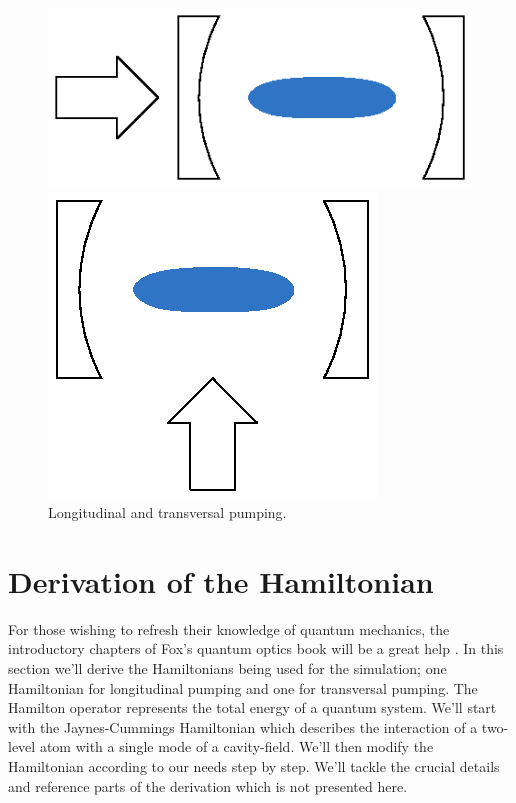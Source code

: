 \begin{figure}[!htb]
	\begin{minipage}[b]{.5\linewidth}
	\centering
	\includegraphics[width=.8\linewidth]{images/pump_long.eps}
	\end{minipage}
%
	\begin{minipage}[b]{.5\linewidth}
	\centering
	\includegraphics[width=.8\linewidth]{images/pump_trans.eps}
	\end{minipage}
\caption{Longitudinal and transversal pumping.}
\label{pumping}
\end{figure}
\FloatBarrier

\section{Derivation of the Hamiltonian}
For those wishing to refresh their knowledge of quantum mechanics, the introductory chapters of Fox's quantum optics book will be a great help \cite{fox}. In this section we'll derive the Hamiltonians being used for the simulation; one Hamiltonian for longitudinal pumping and one for transversal pumping. The Hamilton operator represents the total energy of a quantum system. We'll start with the Jaynes-Cummings Hamiltonian which describes the interaction of a two-level atom with a single mode of a cavity-field. We'll then modify the Hamiltonian according to our needs step by step. We'll tackle the crucial details and reference parts of the derivation which is not presented here.

